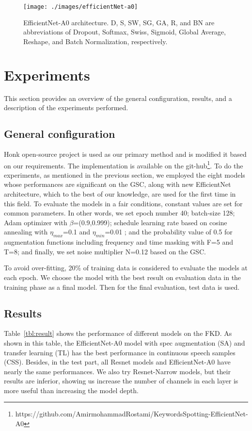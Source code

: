 \documentclass{article}
\begin{document}
\begin{figure}[t]
  \centering
  \texttt{[image: ./images/efficientNet-a0]}
  \caption{EfficientNet-A0 architecture. D, S, SW, SG, GA, R, and BN are abbreviations of Dropout, Softmax, Swiss, Sigmoid, Global Average, Reshape, and Batch Normalization, respectively.}
  \label{fig:effa0}
\end{figure}

\section{Experiments}
This section provides an overview of the general configuration, results, and a description of the experiments performed.

\subsection{General configuration}
Honk open-source project is used as our primary method and is modified it based on our requirements. The implementation is available on the git-hub\footnote{https://github.com/AmirmohammadRostami/KeywordsSpotting-EfficientNet-A0}. To do the experiments, as mentioned in the previous section, we employed the eight models whose performances are significant on the GSC, along with new EfficientNet architecture, which to the best of our knowledge, are used for the first time in this field. To evaluate the models in a fair conditions, constant values are set for common parameters. In other words, we set epoch number 40; batch-size 128; Adam optimizer with $\beta$=(0.9,0.999); schedule learning rate based on cosine annealing with $\eta_{max}$=0.1  and $\eta_{min}$=0.01 ; and the probability value of 0.5 for augmentation functions including frequency and time masking with F=5 and T=8; and finally, we set noise multiplier N=0.12 based on the GSC.

To avoid over-fitting, 20\% of training data is considered to evaluate the models at each epoch. We choose the model with the best result on evaluation data in the training phase as a final model. Then for the final evaluation, test data is used.

\subsection{Results}

Table~\ref{tbl:result} shows the performance of different models on the FKD. As shown in this table, the EfficientNet-A0 model with spec augmentation (SA) and transfer learning (TL) has the best performance in continuous speech samples (CSS). Besides, in the test part, all Resnet models and EfficientNet-A0 have nearly the same performances. We also try Resnet-Narrow models, but their results are inferior, showing us increase the number of channels in each layer is more useful than increasing the model depth.
\end{document}
